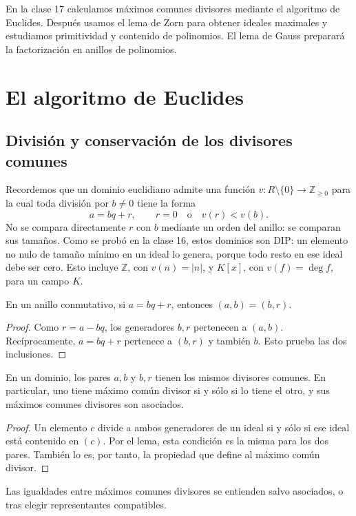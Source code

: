 En la clase 17 calculamos máximos comunes divisores mediante el algoritmo de Euclides. Después usamos el lema de Zorn para obtener ideales maximales y estudiamos primitividad y contenido de polinomios. El lema de Gauss preparará la factorización en anillos de polinomios.

\section{El algoritmo de Euclides}
\subsection{División y conservación de los divisores comunes}
Recordemos que un dominio euclidiano admite una función $v:R\setminus\{0\}\to\mathbb Z_{\geq0}$ para la cual toda división por $b\ne0$ tiene la forma
\[
a=bq+r,\qquad r=0\quad\text{o}\quad v(r)<v(b).
\]
No se compara directamente $r$ con $b$ mediante un orden del anillo: se comparan sus tamaños. Como se probó en la clase 16, estos dominios son DIP: un elemento no nulo de tamaño mínimo en un ideal lo genera, porque todo resto en ese ideal debe ser cero. Esto incluye $\mathbb Z$, con $v(n)=|n|$, y $K[x]$, con $v(f)=\deg f$, para un campo $K$.

\begin{lema}\label{lema:C17-resto}
En un anillo conmutativo, si $a=bq+r$, entonces $(a,b)=(b,r)$.
\end{lema}
\begin{proof}
Como $r=a-bq$, los generadores $b,r$ pertenecen a $(a,b)$. Recíprocamente, $a=bq+r$ pertenece a $(b,r)$ y también $b$. Esto prueba las dos inclusiones.
\end{proof}
\begin{coro}\label{coro:C17-mcd-resto}
En un dominio, los pares $a,b$ y $b,r$ tienen los mismos divisores comunes. En particular, uno tiene máximo común divisor si y sólo si lo tiene el otro, y sus máximos comunes divisores son asociados.
\end{coro}
\begin{proof}
Un elemento $c$ divide a ambos generadores de un ideal si y sólo si ese ideal está contenido en $(c)$. Por el lema, esta condición es la misma para los dos pares. También lo es, por tanto, la propiedad que define al máximo común divisor.
\end{proof}
Las igualdades entre máximos comunes divisores se entienden salvo asociados, o tras elegir representantes compatibles.

